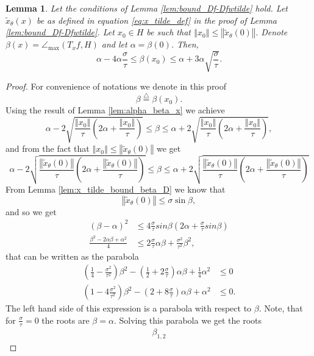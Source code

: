\documentclass[12pt]{article}
\newtheorem{Lemma}[Theorem]{Lemma}
\theoremstyle{remark}
\newcommand{\defeq}{\stackrel{\bigtriangleup}{=}}
\newcommand{\norm}[1]{\left\Vert #1 \right\Vert}
\newcommand{\wtilde}[1]{\widetilde{#1}}
\newcommand{\lrbrackets}[1]{\left( #1 \right)}
\newcommand{\maxangle}{\angle_{\max}}
\begin{document}
\begin{appendices}
\begin{Lemma}\label{lem:alpha_beta_D}
Let the conditions of Lemma \ref{lem:bound_Df-Dfwtilde} hold. Let $\wtilde x_\theta(x)$ be as defined in equation \eqref{eq:x_tilde_def} in the proof of Lemma \ref{lem:bound_Df-Dfwtilde}.
Let $ x_0 \in H $ be such that $ \norm{x_0} \leq \norm{\wtilde x_\theta(0)} $.
	Denote $ \beta(x) = \maxangle(T_{x}f, H) $ and let $ \alpha = \beta(0) $.
	Then,
	\[
	\alpha - 4\alpha\frac{\sigma}{\tau}  \leq \beta(x_0) \leq \alpha + 3\alpha\sqrt{\frac{\sigma}{\tau}}
	.\]
\end{Lemma}
\begin{proof}
	For convenience of notations we denote in this proof 
	\[\beta \defeq \beta(x_0).\]
	Using the result of Lemma \ref{lem:alpha_beta_x} we achieve
	\[
	\alpha - 2 \sqrt{ \frac{\norm{x_0}}{\tau}\lrbrackets{2 \alpha + \frac{\norm{x_0}}{\tau}} } 
	\leq \beta \leq
	\alpha + 2 \sqrt{ \frac{\norm{x_0}}{\tau}\lrbrackets{2 \alpha + \frac{\norm{x_0} }{\tau}}}
	,\]
	and from the fact that $ \norm{x_0} \leq \norm{\wtilde x_\theta(0)} $ we get
	\[
	\alpha - 2 \sqrt{ \frac{\norm{\wtilde x_\theta(0)}}{\tau}\lrbrackets{2 \alpha + \frac{\norm{\wtilde x_\theta(0)}}{\tau}} } 
	\leq \beta \leq
	\alpha + 2 \sqrt{ \frac{\norm{\wtilde x_\theta(0)}}{\tau}\lrbrackets{2 \alpha + \frac{\norm{\wtilde x_\theta(0)}}{\tau}} }
	\]
	From Lemma \ref{lem:x_tilde_bound_beta_D} we know that
	\[
	\norm{\wtilde x_\theta(0)} \leq \sigma \sin\beta
	,\]
	and so we get
	\begin{align*}
	\lrbrackets{\beta - \alpha}^2 
	&\leq
	4\frac{\sigma}{\tau}sin\beta\lrbrackets{2\alpha   + \frac{\sigma}{\tau}sin\beta} \\
	\frac{\beta^2-2\alpha\beta + \alpha^2}{4} 
	&\leq 
	2 \frac{\sigma}{\tau}\alpha\beta + \frac{\sigma^2}{\tau^2}\beta^2
	,\end{align*}
	that can be written as the parabola 
	\begin{align*}
	\lrbrackets{\frac{1}{4} - \frac{\sigma^2}{\tau^2}}\beta^2 - \lrbrackets{\frac{1}{2} + 2 \frac{\sigma}{\tau} }\alpha \beta + \frac{1}{4}\alpha^2 & \leq
	0 \\
	\lrbrackets{1 - 4\frac{\sigma^2}{\tau^2}}\beta^2 - \lrbrackets{2 + 8 \frac{\sigma}{\tau} }\alpha \beta + \alpha^2 & \leq
	0 
	.\end{align*}
	The left hand side of this expression is a parabola with respect to $\beta$.
	Note, that for $\frac{\sigma}{\tau} = 0$ the roots are $\beta = \alpha$.
	Solving this parabola we get the roots
	\begin{align*}
	\beta_{1,2} 

\end{align*}
\end{proof}
\end{appendices}
\end{document}

